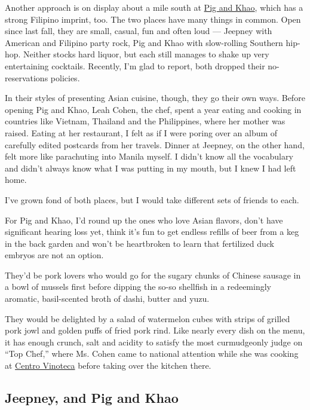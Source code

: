 Another approach is on display about a mile south at
\href{http://pigandkhao.com/}{Pig and Khao}, which has a strong Filipino
imprint, too. The two places have many things in common. Open since last
fall, they are small, casual, fun and often loud --- Jeepney with
American and Filipino party rock, Pig and Khao with slow-rolling
Southern hip-hop. Neither stocks hard liquor, but each still manages to
shake up very entertaining cocktails. Recently, I'm glad to report, both
dropped their no-reservations policies.

In their styles of presenting Asian cuisine, though, they go their own
ways. Before opening Pig and Khao, Leah Cohen, the chef, spent a year
eating and cooking in countries like Vietnam, Thailand and the
Philippines, where her mother was raised. Eating at her restaurant, I
felt as if I were poring over an album of carefully edited postcards
from her travels. Dinner at Jeepney, on the other hand, felt more like
parachuting into Manila myself. I didn't know all the vocabulary and
didn't always know what I was putting in my mouth, but I knew I had left
home.

I've grown fond of both places, but I would take different sets of
friends to each.

For Pig and Khao, I'd round up the ones who love Asian flavors, don't
have significant hearing loss yet, think it's fun to get endless refills
of beer from a keg in the back garden and won't be heartbroken to learn
that fertilized duck embryos are not an option.

They'd be pork lovers who would go for the sugary chunks of Chinese
sausage in a bowl of mussels first before dipping the so-so shellfish in
a redeemingly aromatic, basil-scented broth of dashi, butter and yuzu.

They would be delighted by a salad of watermelon cubes with strips of
grilled pork jowl and golden puffs of fried pork rind. Like nearly every
dish on the menu, it has enough crunch, salt and acidity to satisfy the
most curmudgeonly judge on ``Top Chef,'' where Ms. Cohen came to
national attention while she was cooking at
\href{http://events.nytimes3xbfgragh.onion/2007/10/17/dining/reviews/17rest.html?pagewanted=all}{Centro
Vinoteca} before taking over the kitchen there.

\href{https://www.nytimes3xbfgragh.onion/slideshow/2013/03/13/dining/20130313-REST.html}{}

\hypertarget{jeepney-and-pig-and-khao}{%
\subsection{Jeepney, and Pig and Khao}\label{jeepney-and-pig-and-khao}}

